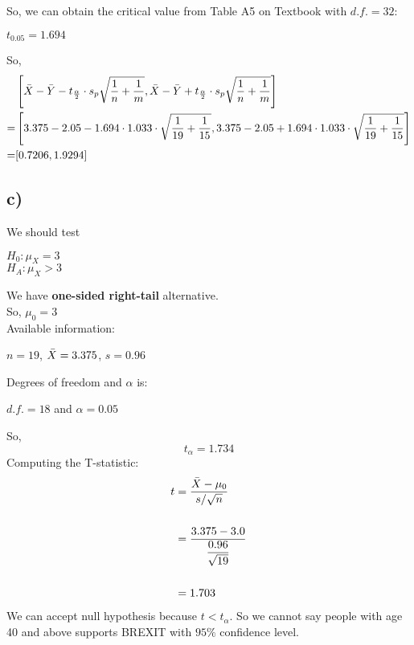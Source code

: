 \documentclass[12pt]{article}
\begin{document}
So, we can obtain the critical value from Table A5 on Textbook with $d.f. = 32$:
\begin{center}
    $t_{0.05} = 1.694$
\end{center}
So, 
\begin{equation}
    \begin{split}
        & \left[ \Bar{X} - \Bar{Y} - t_{\frac{\alpha}{2}} \cdot s_p \sqrt{\dfrac{1}{n}+\dfrac{1}{m}}, \Bar{X} - \Bar{Y} + t_{\frac{\alpha}{2}} \cdot s_p \sqrt{\dfrac{1}{n}+\dfrac{1}{m}} \right] \\
        =& \left[ 3.375 - 2.05 - 1.694 \cdot 1.033 \cdot \sqrt{\dfrac{1}{19}+\dfrac{1}{15}}, 3.375 - 2.05 + 1.694 \cdot 1.033 \cdot \sqrt{\dfrac{1}{19}+\dfrac{1}{15}} \right] \\
        =&[0.7206, 1.9294]
    \end{split}
\end{equation}
\subsection*{c)}
We should test \\
\begin{center}
    $H_0 : \mu _X = 3$\\
    $H_A : \mu_X > 3$    
\end{center}
We have \textbf{one-sided right-tail} alternative.\\
So, $\mu_0 = 3$\\
Available information:
\begin{center}
    $n = 19$, $\Bar{X} = 3.375$, $s = 0.96$
\end{center}
Degrees of freedom and $\alpha$ is:
\begin{center}
    $d.f. = 18$ and $\alpha = 0.05$
\end{center}
So, 
\begin{equation}
    t_{\alpha} = 1.734
\end{equation}
Computing the T-statistic:
\begin{equation}
    \begin{split}
        t &= \dfrac{\Bar{X} - \mu_0}{s/\sqrt{n}}\\ \\
        &= \dfrac{3.375-3.0}{\dfrac{0.96}{\sqrt{19}}}\\ \\
        &= 1.703 
    \end{split}
\end{equation}
We can accept null hypothesis because $t < t_{\alpha}$. So we cannot say people with age 40 and above supports BREXIT with $95\%$ confidence level.
\end{document}
